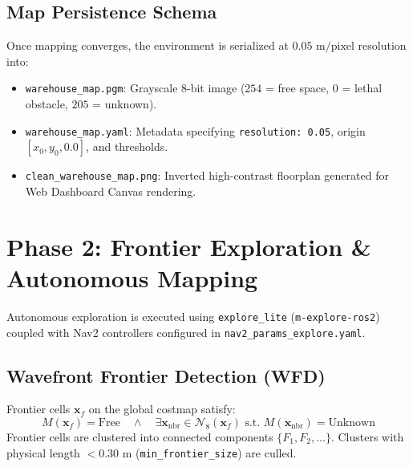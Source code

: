\documentclass[10pt,a4paper]{article}
\begin{document}
\subsection{Map Persistence Schema}
Once mapping converges, the environment is serialized at $0.05\text{ m/pixel}$ resolution into:
\begin{itemize}
    \item \texttt{warehouse\_map.pgm}: Grayscale 8-bit image ($254$ = free space, $0$ = lethal obstacle, $205$ = unknown).
    \item \texttt{warehouse\_map.yaml}: Metadata specifying \texttt{resolution: 0.05}, origin $[x_0, y_0, 0.0]$, and thresholds.
    \item \texttt{clean\_warehouse\_map.png}: Inverted high-contrast floorplan generated for Web Dashboard Canvas rendering.
\end{itemize}

\section{Phase 2: Frontier Exploration \& Autonomous Mapping}

Autonomous exploration is executed using \texttt{explore\_lite} (\texttt{m-explore-ros2}) coupled with Nav2 controllers configured in \texttt{nav2\_params\_explore.yaml}.

\subsection{Wavefront Frontier Detection (WFD)}
Frontier cells $\mathbf{x}_f$ on the global costmap satisfy:
\begin{equation}
M(\mathbf{x}_f) = \text{Free} \quad \wedge \quad \exists \mathbf{x}_{\text{nbr}} \in \mathcal{N}_8(\mathbf{x}_f) \text{ s.t. } M(\mathbf{x}_{\text{nbr}}) = \text{Unknown}
\end{equation}
Frontier cells are clustered into connected components $\{F_1, F_2, \dots\}$. Clusters with physical length $< 0.30\text{ m}$ (\texttt{min\_frontier\_size}) are culled.
\end{document}
